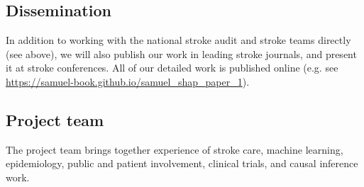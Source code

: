 \subsection{Dissemination}

In addition to working with the national stroke audit and stroke teams directly (see above), we will also publish our work in leading stroke journals, and present it at stroke conferences. All of our detailed work is published online (e.g. see \url{https://samuel-book.github.io/samuel_shap_paper_1}).

\subsection{Project team}

The project team brings together experience of stroke care, machine learning, epidemiology, public and patient involvement, clinical trials, and causal inference work.

